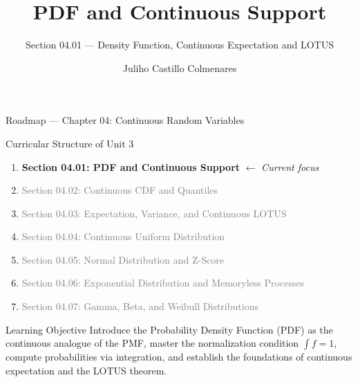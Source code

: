 \documentclass[aspectratio=169,xcolor={dvipsnames,table}]{beamer}
\title{PDF and Continuous Support}
\subtitle{Section 04.01 --- Density Function, Continuous Expectation and LOTUS}
\author[J. Castillo Colmenares]{Juliho Castillo Colmenares}
\institute[Tec de Monterrey]{Tecnologico de Monterrey}
\date{\vspace{-1.5cm}}
\begin{document}
\begin{frame}[plain]
	\titlepage
\end{frame}

\begin{frame}{Roadmap --- Chapter 04: Continuous Random Variables}
	\vspace{-0.15cm}
	\begin{block}{Curricular Structure of Unit 3}
		\footnotesize
		\begin{enumerate}\itemsep=0.03cm
			\item \textbf{\textcolor{TecRojo}{Section 04.01: PDF and Continuous Support}} $\leftarrow$ \emph{Current focus}
			\item \textcolor{gray}{Section 04.02: Continuous CDF and Quantiles}
			\item \textcolor{gray}{Section 04.03: Expectation, Variance, and Continuous LOTUS}
			\item \textcolor{gray}{Section 04.04: Continuous Uniform Distribution}
			\item \textcolor{gray}{Section 04.05: Normal Distribution and Z-Score}
			\item \textcolor{gray}{Section 04.06: Exponential Distribution and Memoryless Processes}
			\item \textcolor{gray}{Section 04.07: Gamma, Beta, and Weibull Distributions}
		\end{enumerate}
	\end{block}
	\vspace{-0.2cm}
	\begin{alertblock}{Learning Objective}
		\scriptsize
		Introduce the Probability Density Function (PDF) as the continuous analogue of the PMF, master the normalization condition $\int f = 1$, compute probabilities via integration, and establish the foundations of continuous expectation and the LOTUS theorem.
	\end{alertblock}
\end{frame}
\end{document}
